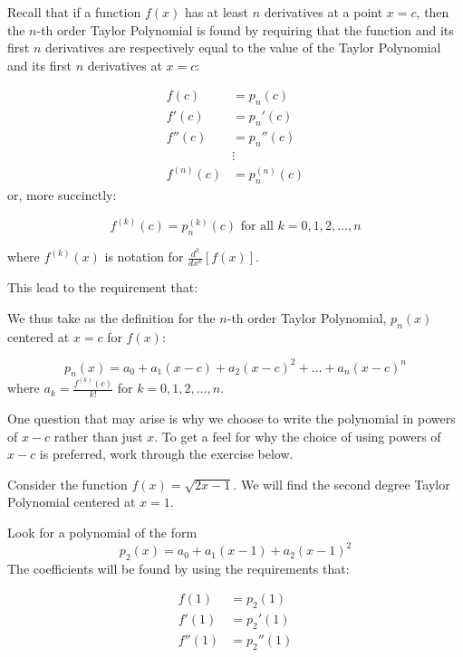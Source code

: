 \documentclass{ximera}
\author{Jim Talamo}
\begin{document}
\begin{exercise}
Recall that if a function $f(x)$ has at least $n$ derivatives at a point $x=c$, then the $n$-th order Taylor Polynomial is found by requiring that the function and its first $n$ derivatives are respectively equal to the value of the Taylor Polynomial and its first $n$ derivatives at $x=c$:

\begin{align*}
f(c) &= p_n(c) \\
f'(c) &= p_n'(c) \\
f''(c) &= p_n''(c) \\ 
& \vdots \\
f^{(n)}(c) &= p_n^{(n)}(c)
\end{align*}
or, more succinctly:

\[ f^{(k)}(c) = p_n^{(k)}(c) \textrm{ for all } k=0,1,2, \ldots , n \]

where $f^{(k)}(x)$ is notation for $\frac{d^k}{dx^k}\left[f(x)\right]$.

This lead to the requirement that:
\begin{multipleChoice}
\end{multipleChoice}

We thus take as the definition for the $n$-th order Taylor Polynomial, $p_n(x)$ centered at $x=c$ for $f(x)$:

\[
p_n(x) = a_0 +a_1(x-c)+a_2(x-c)^2+\ldots+a_n(x-c)^n
\]
where $a_k = \frac{f^{(k)}(c)}{k!}$ for $k=0,1,2, \ldots , n$.

One question that may arise is why we choose to write the polynomial in powers of $x-c$ rather than just $x$.  To get a feel for why the choice of using powers of $x-c$ is preferred, work through the exercise below.

Consider the function $f(x) = \sqrt{2x-1}$. We will find the second degree Taylor Polynomial centered at $x=1$.

\begin{exercise}
\begin{exercise}
Look for a polynomial of the form
\[
p_2(x) = a_0 +a_1(x-1)+a_2(x-1)^2
\]
The coefficients will be found by using the requirements that:

\begin{align*}
f(1) &= p_2(1) \\
f'(1) &= p_2'(1) \\
f''(1) &= p_2''(1) 
\end{align*} 


\end{exercise}
\end{exercise}
\end{exercise}
\end{document}
